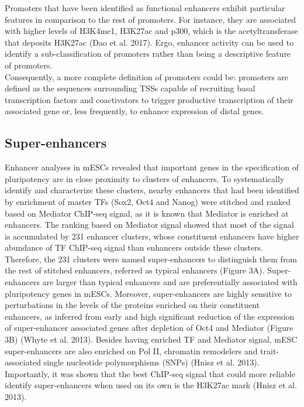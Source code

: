 Promoters that have been identified as functional enhancers exhibit particular features in comparison to the rest of promoters. For instance, they are associated with higher levels of H3K4me1, H3K27ac and p300, which is the acetyltransferase that deposits H3K27ac (Dao et al. 2017). Ergo, enhancer activity can be used to identify a sub-classification of promoters rather than being a descriptive feature of promoters.\\

Consequently, a more complete definition of promoters could be: promoters are defined as the sequences surrounding TSSs capable of recruiting basal transcription factors and coactivators to trigger productive transcription of their associated gene or, less frequently, to enhance expression of distal genes.\\


		\subsection{Super-enhancers}

Enhancer analyses in mESCs revealed that important genes in the specification of pluripotency are in close proximity to clusters of enhancers. To systematically identify and characterize these clusters, nearby enhancers that had been identified by enrichment of master TFs (Sox2, Oct4 and Nanog) were stitched and ranked based on Mediator ChIP-seq signal, as it is known that Mediator is enriched at enhancers. The ranking based on Mediator signal showed that most of the signal is accumulated by 231 enhancer clusters, whose constituent enhancers have higher abundance of TF ChIP-seq signal than enhancers outside these clusters. Therefore, the 231 clusters were named super-enhancers to distinguish them from the rest of stitched enhancers, referred as typical enhancers (Figure 3A). Super-enhancers are larger than typical enhancers and are preferentially associated with pluripotency genes in mESCs. Moreover, super-enhancers are highly sensitive to perturbations in the levels of the proteins enriched on their constituent enhancers, as inferred from early and high significant reduction of the expression of super-enhancer associated genes after depletion of Oct4 and Mediator (Figure 3B) (Whyte et al. 2013). Besides having enriched TF and Mediator signal, mESC super-enhancers are also enriched on Pol II, chromatin remodelers and trait-associated single nucleotide polymorphisms (SNPs) (Hnisz et al. 2013). Importantly, it was shown that the best ChIP-seq signal that could more reliable identify super-enhancers when used on its own is the H3K27ac mark (Hnisz et al. 2013).\\

